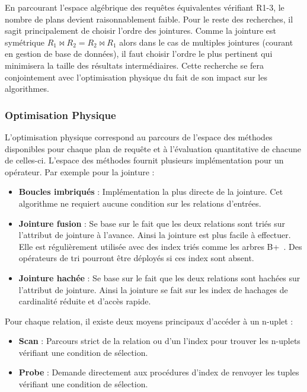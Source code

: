 En parcourant l'espace algébrique des requêtes équivalentes vérifiant R1-3, le nombre de plans devient raisonnablement faible. Pour le reste des recherches, il sagit principalement de choisir l'ordre des jointures. Comme la jointure est symétrique $R_1 \Join R_2 = R_2 \Join R_1$ alors dans le cas de multiples jointures (courant en gestion de base de données), il faut choisir l'ordre le plus pertinent qui minimisera la taille des résultats intermédiaires. Cette recherche se fera conjointement avec l'optimisation physique du fait de son impact sur les algorithmes.

\subsubsection{Optimisation Physique}
L'optimisation physique correspond au parcours de l'espace des méthodes disponibles pour chaque plan de requête et à l'évaluation quantitative de chacune de celles-ci. L'espace des méthodes fournit plusieurs implémentation pour un opérateur. Par exemple pour la jointure :
\begin{itemize}
    \item \textbf{Boucles imbriqués} : Implémentation la plus directe de la jointure. Cet algorithme ne requiert aucune condition sur les relations d'entrées.
    \item \textbf{Jointure fusion} : Se base sur le fait que les deux relations sont triés sur l'attribut de jointure à l'avance. Ainsi la jointure est plus facile à effectuer. Elle est régulièrement utilisée avec des index triés comme les arbres B+~\cite{Comer:btree}. Des opérateurs de tri pourront être déployés si ces index sont absent.
    \item \textbf{Jointure hachée} : Se base sur le fait que les deux relations sont hachées sur l'attribut de jointure. Ainsi la jointure se fait sur les index de hachages de cardinalité réduite et d'accès rapide.
\end{itemize}

Pour chaque relation, il existe deux moyens principaux d'accéder à un n-uplet :
\begin{itemize}
 \item \textbf{Scan} : Parcours strict de la relation ou d'un l'index pour trouver les n-uplets vérifiant une condition de sélection.
 \item \textbf{Probe} : Demande directement aux procédures d'index de renvoyer les tuples vérifiant une condition de sélection.
\end{itemize}

